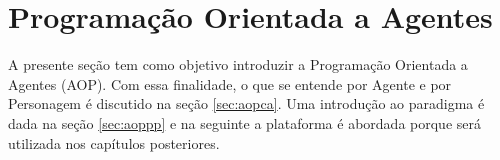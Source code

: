 \section{Programação Orientada a Agentes}

A presente seção tem como objetivo introduzir a Programação Orientada a
Agentes (AOP). Com essa finalidade,
o que se entende por Agente e por Personagem é discutido na seção
\ref{sec:aopca}. Uma introdução ao paradigma é dada na seção
\ref{sec:aoppp} e na seguinte a plataforma \jason é abordada
porque será utilizada nos capítulos posteriores.





